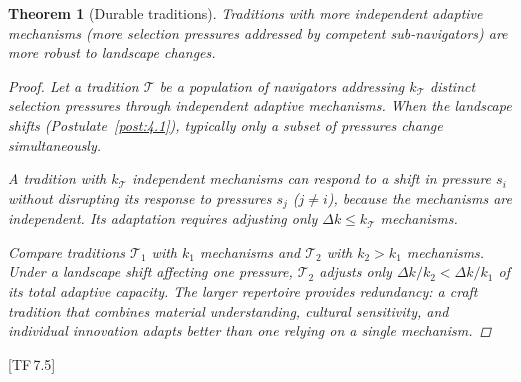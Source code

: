 \documentclass[11pt, a4paper]{article}
\theoremstyle{definition}
\theoremstyle{plain}
\newtheorem{theorem}[definition]{Theorem}
\theoremstyle{remark}
\newcommand{\TF}[1]{\textnormal{[TF\,#1]}}  %
\begin{document}
\begin{theorem}[Durable traditions]\label{thm:10.2}
Traditions with more independent adaptive mechanisms (more selection
pressures addressed by competent sub-navigators) are more robust to
landscape changes.

\begin{proof}
Let a tradition $\mathcal{T}$ be a population of navigators addressing
$k_\mathcal{T}$ distinct selection pressures through independent adaptive
mechanisms. When the landscape shifts (Postulate~\ref{post:4.1}),
typically only a subset of pressures change simultaneously.

A tradition with $k_\mathcal{T}$ independent mechanisms can respond to
a shift in pressure $s_i$ without disrupting its response to pressures
$s_j$ ($j \neq i$), because the mechanisms are independent. Its
adaptation requires adjusting only $\Delta k \leq k_\mathcal{T}$
mechanisms.

Compare traditions $\mathcal{T}_1$ with $k_1$ mechanisms and
$\mathcal{T}_2$ with $k_2 > k_1$ mechanisms. Under a landscape shift
affecting one pressure, $\mathcal{T}_2$ adjusts only
$\Delta k / k_2 < \Delta k / k_1$ of its total adaptive capacity.
The larger repertoire provides redundancy: a craft tradition that
combines material understanding, cultural sensitivity, and individual
innovation adapts better than one relying on a single mechanism.
\qedhere
\end{proof}
\end{theorem}

\TF{7.5}
\end{document}
